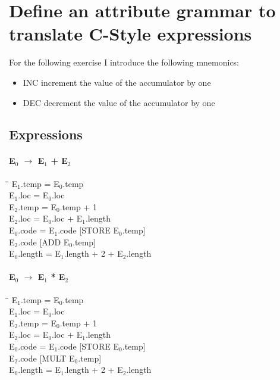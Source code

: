\section{Define an attribute grammar to translate C-Style expressions}

For the following exercise I introduce the following mnemonics:
\begin{itemize}
	\item INC increment the value of the accumulator by one
	\item DEC decrement the value of the accumulator by one
\end{itemize}

\subsection{Expressions}
\paragraph{E$_{0}$ $\rightarrow$ E$_{1}$ + E$_{2}$}
\begin{tabbing}
	\hspace*{0.5cm}\=\hspace*{3.3cm}\=\hspace*{0.5cm}\=\hspace*{10cm}\= \kill
	\>E$_{1}$.temp 			\>= \>E$_{0}$.temp \\
	\>E$_{1}$.loc 			\>= \>E$_{0}$.loc \\
	\>E$_{2}$.temp 			\>= \>E$_{0}$.temp + 1 \\
	\>E$_{2}$.loc 			\>= \>E$_{0}$.loc + E$_{1}$.length \\
	\>E$_{0}$.code			\>=	\>E$_{1}$.code [STORE E$_{0}$.temp] \\
	\>									\>	\>E$_{2}$.code [ADD E$_{0}$.temp] \\
	\>E$_{0}$.length		\>=	\>E$_{1}$.length + 2 + E$_{2}$.length
\end{tabbing}

\paragraph{E$_{0}$ $\rightarrow$ E$_{1}$ * E$_{2}$}
\begin{tabbing}
	\hspace*{0.5cm}\=\hspace*{3.3cm}\=\hspace*{0.5cm}\=\hspace*{10cm}\= \kill
	\>E$_{1}$.temp 			\>= \>E$_{0}$.temp \\
	\>E$_{1}$.loc 			\>= \>E$_{0}$.loc \\
	\>E$_{2}$.temp 			\>= \>E$_{0}$.temp + 1 \\
	\>E$_{2}$.loc 			\>= \>E$_{0}$.loc + E$_{1}$.length \\
	\>E$_{0}$.code			\>=	\>E$_{1}$.code [STORE E$_{0}$.temp] \\
	\>									\>	\>E$_{2}$.code [MULT E$_{0}$.temp] \\
	\>E$_{0}$.length		\>=	\>E$_{1}$.length + 2 + E$_{2}$.length
\end{tabbing}

